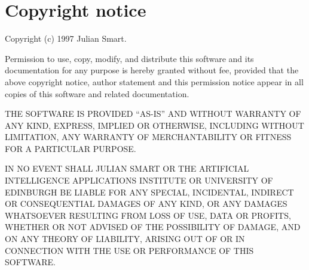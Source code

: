 %
%
\newcommand{\commandref}[2]{\helpref{{\tt $\backslash$#1}}{#2}}%
\newcommand{\commandrefn}[2]{\helprefn{{\tt $\backslash$#1}}{#2}\index{#1}}%
\newcommand{\commandpageref}[2]{\latexignore{\helprefn{{\tt $\backslash$#1}}{#2}}\latexonly{{\tt $\backslash$#1} {\it page \pageref{#2}}}\index{#1}}%
\newcommand{\indexit}[1]{#1\index{#1}}%
\newcommand{\inioption}[1]{{\bf {\tt #1}}\index{#1}}%
\parskip=10pt%
\parindent=0pt%
%
%
\makeindex%
%
\maketitle%
\pagestyle{fancyplain}%
%
%
%
\setfooter{\thepage}{}{}{}{}{\thepage}%
\tableofcontents%

\chapter*{Copyright notice}%
%
\setfooter{\thepage}{}{}{}{}{\thepage}%

Copyright (c) 1997 Julian Smart.

Permission to use, copy, modify, and distribute this software and its
documentation for any purpose is hereby granted without fee, provided that the
above copyright notice, author statement and this permission notice appear in
all copies of this software and related documentation.

THE SOFTWARE IS PROVIDED ``AS-IS'' AND WITHOUT WARRANTY OF ANY KIND, EXPRESS,
IMPLIED OR OTHERWISE, INCLUDING WITHOUT LIMITATION, ANY WARRANTY OF
MERCHANTABILITY OR FITNESS FOR A PARTICULAR PURPOSE.

IN NO EVENT SHALL JULIAN SMART OR THE ARTIFICIAL INTELLIGENCE
APPLICATIONS INSTITUTE OR UNIVERSITY OF EDINBURGH BE LIABLE FOR ANY
SPECIAL, INCIDENTAL, INDIRECT OR CONSEQUENTIAL DAMAGES OF ANY KIND, OR
ANY DAMAGES WHATSOEVER RESULTING FROM LOSS OF USE, DATA OR PROFITS,
WHETHER OR NOT ADVISED OF THE POSSIBILITY OF DAMAGE, AND ON ANY THEORY
OF LIABILITY, ARISING OUT OF OR IN CONNECTION WITH THE USE OR
PERFORMANCE OF THIS SOFTWARE.

